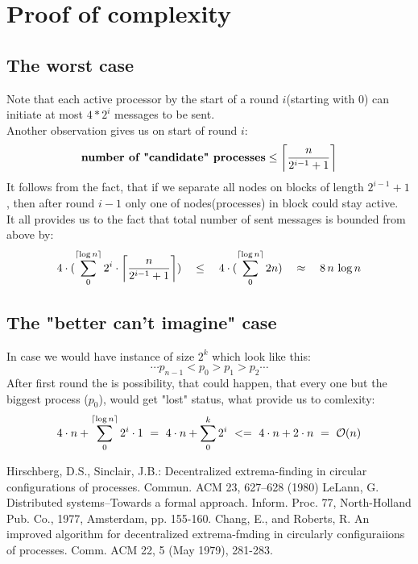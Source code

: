 \documentclass{article}
\DeclarePairedDelimiter\ceil{\lceil}{\rceil}
\begin{document}
\section*{Proof of complexity}
\subsection*{The worst case}
   Note that each active processor by the start of a round $i$(starting with 0) can initiate at most $4*2^i$ messages to be sent. \\
   Another observation gives us on start of round $i$:
   \[\textbf{number of "candidate" processes} \leq \ceil*{\frac{n}{2^{i-1} + 1}}\]
   It follows from the fact, that if we separate all nodes on blocks of length $2^{i-1} + 1$, then after round $i-1$ only one of nodes(processes) in block could stay active.\\

   \bigskip
   \noindent
   It all provides us to the fact that total number of sent messages is bounded from above by:
   \[4\cdot(\sum_0^{\ceil*{\log n}} 2^i \cdot \ceil*{\frac{n}{2^{i-1} + 1}})
   \quad\leq\quad 4\cdot(\sum_0^{\ceil{\log n}} 2n) \quad \approx \quad 8\, n \,\log n\]
  \subsection*{The "better can't imagine" case}
    In case we would have instance of size $2^k$ which look like this:
    \[\cdots p_{n-1} < p_0 > p_1 > p_2 \cdots\]
    After first round the is possibility, that could happen, that every one but the biggest process ($p_0$), would get "lost" status, what provide us to comlexity:
    \[4\cdot n + \sum_0^{\ceil*{\log n}} 2^i \cdot 1 \,\,= \,\,
    4\cdot n + \sum_0^{k} 2^i
    \,\, <= \,\,
    4\cdot n + 2 \cdot n\,\, = \,\,\mathcal{O}(n)\]


\begin{thebibliography}{9}
Hirschberg, D.S., Sinclair, J.B.: Decentralized extrema-finding in circular configurations of processes. Commun. ACM 23, 627–628 (1980)
LeLann, G. Distributed systems--Towards a formal approach. Inform. Proc. 77, North-Holland Pub. Co., 1977, Amsterdam, pp. 155-160.
Chang, E., and Roberts, R. An improved algorithm for decentralized extrema-fmding in circularly configuraiions of processes. Comm. ACM 22, 5 (May 1979), 281-283.
\end{thebibliography}
\end{document}
